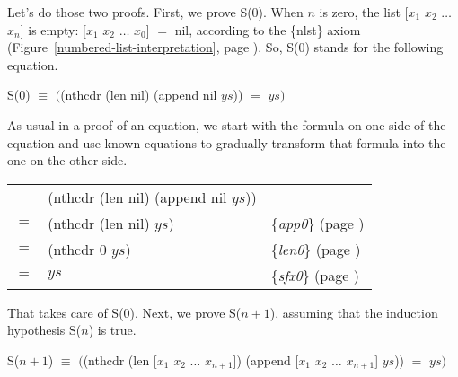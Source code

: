 Let's do those two proofs.
First, we prove S(0).
When $n$ is zero, the list \textsf{[$x_1$ $x_2$ $\dots$ $x_n$]} is empty:
\textsf{[$x_1$ $x_2$ $\dots$ $x_0$]} $=$ \textsf{nil}, according to the \{nlst\} axiom
(Figure~\ref{numbered-list-interpretation}, page \pageref{numbered-list-interpretation}).
So, S(0) stands for the following equation.
\begin{center}
S(0) $\equiv$ $($\textsf{(nthcdr (len nil) (append nil $ys$))} $=$ $ys)$
\end{center}
As usual in a proof of an equation,
we start with the formula on one side of the equation
and use known equations to gradually transform that formula
into the one on the other side.
\begin{center}
\begin{tabular}{lll}
    & \textsf{(nthcdr (len nil) (append nil $ys$))}  &                                                  \\
$=$ & \textsf{(nthcdr (len nil) $ys$)}               & \{\emph{app0}\} (page \pageref{fig:append-defun})\\
$=$ & \textsf{(nthcdr 0 $ys$)}                       & \{\emph{len0}\} (page \pageref{len-equations})   \\
$=$ & $ys$                                  & \{\emph{sfx0}\} (page \pageref{fig:nthcdr-defun})\\
\end{tabular}
\end{center}

That takes care of S(0). Next, we prove S($n+1$), assuming that
the induction hypothesis S($n$) is true.
\begin{center}
S($n+1$) $\equiv$ $($\textsf{(nthcdr (len [$x_1$ $x_2$ $\dots$ $x_{n+1}$]) (append [$x_1$ $x_2$ $\dots$ $x_{n+1}$] $ys$))} $=$ $ys)$
\end{center}

